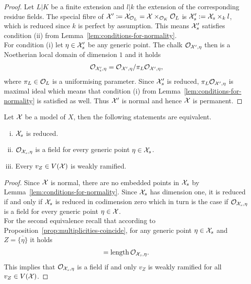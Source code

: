 \begin{proof}
    Let $L|K$ be a finite extension and $l|k$ the extension of the corresponding residue fields.
    The special fibre of $\mathcal X' \coloneqq \mathcal X_{\mathcal O_L} = \mathcal X \times_{\mathcal O_K} \mathcal O_L$ is $\mathcal X'_s := \mathcal X_s \times_k l$,
    which is reduced since $k$ is perfect by assumption.
    This means $\mathcal X'_s$ satisfies condition (ii) from Lemma~\ref{lem:conditions-for-normality}. \\
    For condition (i) let $\eta \in \mathcal X'_s$ be any generic point.
    The chalk $\mathcal{O}_{\mathcal X', \eta}$ then is a Noetherian local domain of dimension $1$ and it holds
    \begin{align}
        \mathcal{O}_{\mathcal X'_s, \eta} = \mathcal{O}_{\mathcal X', \eta}/\pi_L\mathcal{O}_{\mathcal X', \eta},
    \end{align}
    where $\pi_L \in \mathcal O_L$ is a uniformising parameter.
    Since $\mathcal X'_s$ is reduced, $\pi_L\mathcal{O}_{\mathcal X',\eta}$ is maximal ideal which means that
    condition (i) from Lemma~\ref{lem:conditions-for-normality} is satisfied as well.
    Thus $\mathcal X'$ is normal and hence $\mathcal X$ is permanent.
\end{proof}

\begin{proposition}\label{prop:criterion-reducedness}
    Let $\mathcal X$ be a model of $X$, then the following statements are equivalent.
    \begin{enumerate}[(i)]
        \item $\mathcal X_s$ is reduced.
        \item $\mathcal{O}_{\mathcal X_s, \eta}$ is a field for every generic point $\eta \in \mathcal X_s$.
        \item Every $v_Z \in V(\mathcal X)$ is weakly ramified.
    \end{enumerate}
\end{proposition}

\begin{proof}
    Since $\mathcal X$ is normal, there are no embedded points in $\mathcal X_s$ by Lemma~\ref{lem:conditions-for-normality}.
    Since $\mathcal X_s$ has dimension one, it is reduced if and only if $\mathcal X_s$ is reduced in codimension zero
    which in turn is the case if $\mathcal{O}_{\mathcal X_s, \eta}$ is a field for every generic point $\eta \in \mathcal X$. \\
    For the second equivalence recall that according to Proposition~\ref{prop:multiplicities-coincide},
    for any generic point $\eta\in \mathcal X_s$ and $Z = \overline{\lbrace\eta\rbrace}$ it holds
    \begin{align}
        [\Gamma_{v_Z}: \Gamma_K] = \length \OO_{\X_s, \eta}.
    \end{align}
    This implies that $\mathcal{O}_{\mathcal X_s, \eta}$ is a field if and only $v_Z$ is weakly ramified for all $v_Z \in V(\mathcal X)$.
\end{proof}

